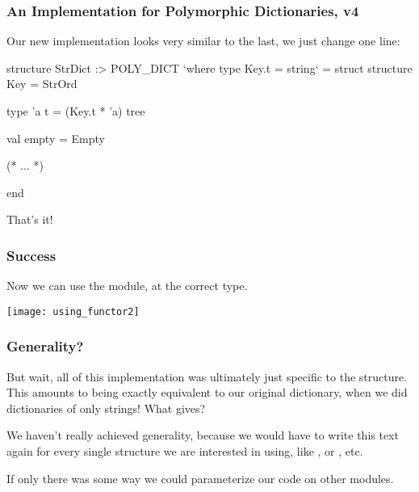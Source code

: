 \documentclass[aspectratio=169, handout]{beamer}
\begin{document}
\begin{frame}[fragile]
  \frametitle{An Implementation for Polymorphic Dictionaries, v4}

  Our new implementation looks very similar to the last, we just change one line:

  \pause
  \vspace{\fill}

  \begin{codeblock}
    structure StrDict :> POLY_DICT `where type Key.t = string` =
      struct
        structure Key = StrOrd

        type 'a t = (Key.t * 'a) tree

        val empty = Empty

        (* ... *)

      end
  \end{codeblock}

  \pause
  \vspace{\fill}

  That's it!
\end{frame}

\begin{frame}[fragile]
  \frametitle{Success}

  Now we can use the  module, at the correct type.

  \pause
  \vspace{\fill}

  \begin{mdframed}[leftmargin=1cm, roundcorner=10pt, backgroundcolor=black!86!white, rightmargin=1cm]
  \begin{center}
  \texttt{[image: using\_functor2]}
  \end{center}
  \end{mdframed}
\end{frame}

\begin{frame}[fragile]
  \frametitle{Generality?}

  But wait, all of this implementation was ultimately just specific to the
   structure. This amounts to being exactly equivalent to our
  original dictionary, when we did dictionaries of only strings! What gives?

  \pause
  \vspace{\fill}

  We haven't really achieved generality, because we would have to write this
  text again for every single  structure we are interested in using,
  like , or , etc.

  \pause
  \vspace{\fill}

  If only there was some way we could parameterize our code on other modules.
\end{frame}
\end{document}
